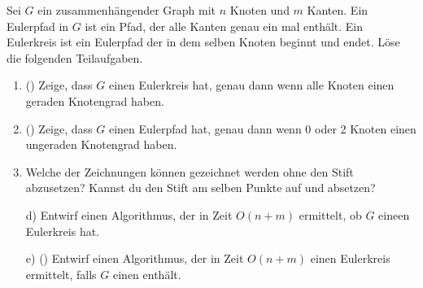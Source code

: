 \documentclass{uebung_cs}
\begin{document}
\begin{aufgabe}
\begin{aufgabe}
	Sei $G$ ein zusammenhängender Graph mit $n$ Knoten und $m$ Kanten.
	Ein Eulerpfad in $G$ ist ein Pfad, der alle Kanten genau ein mal enthält.
	Ein Eulerkreis ist ein Eulerpfad der in dem selben Knoten beginnt und endet.
	Löse die folgenden Teilaufgaben.
	\begin{enumerate}
		\item (\hard) Zeige, dass $G$ einen Eulerkreis hat, genau dann wenn alle Knoten einen geraden Knotengrad haben.
		\item (\hard) Zeige, dass $G$ einen Eulerpfad hat, genau dann wenn 0 oder 2 Knoten einen ungeraden Knotengrad haben.
		\item Welche der Zeichnungen können gezeichnet werden ohne den Stift abzusetzen?
		Kannst du den Stift am selben Punkte auf und absetzen?
	\end{enumerate}
\end{aufgabe}

\begin{center}
	\hspace{1.5cm}
	\hspace{1.5cm}
\end{center}
\begin{enumerate}
	\item[d)] Entwirf einen Algorithmus, der in Zeit $O(n+m)$ ermittelt, ob $G$ eineen Eulerkreis hat.
	\item[e)] (\hard) Entwirf einen Algorithmus, der in Zeit $O(n+m)$ einen Eulerkreis ermittelt, falls $G$ einen enthält.
\end{enumerate}	


\end{aufgabe}
\end{document}
